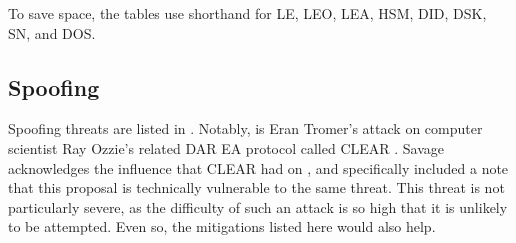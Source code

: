 To save space, the tables use shorthand for \acf{LE}, \acf{LEO}, \acf{LEA}, \acf{HSM}, \acf{DID}, \acf{DSK}, \acf{SN},
and \acf{DOS}.

\newcommand{\threattablesettings}{\FlushLeft \small}

\newcommand{\threattablebegin}[3]{
  \begin{FlushLeft}
    \small
    \singlespacing
    \begin{longtable}{ lp{3cm}p{5.2cm}p{6cm} }
      \caption{#1 Threats}
      \label{table-#2}
      \\ \toprule
      \thead{ID} & \thead{#3} & \thead{Effect} & \thead{Mitigation}
      \\ \midrule
      \endfirsthead
      \caption[]{#1 Threats (continued)}
      \\
      \toprule
      \thead{ID} & \thead{#3} & \thead{Effect} & \thead{Mitigation}
      \\
      \endhead
      \endfoot
      \bottomrule
      \endlastfoot
}

\newcommand{\threattableend}{
    \end{longtable}
  \end{FlushLeft}
}

\subsection{Spoofing}

Spoofing threats are listed in . Notably,  is Eran Tromer's attack \cite{tromer_2018} on
computer scientist Ray Ozzie's related \ac{DAR} \ac{EA} protocol called CLEAR \cite{ozzie_2018}. Savage acknowledges the
influence that CLEAR had on \ldawmsR, and specifically included a note that this proposal is technically vulnerable to
the same threat. This threat is not particularly severe, as the difficulty of such an attack is so high that it is
unlikely to be attempted. Even so, the mitigations listed here would also help.

